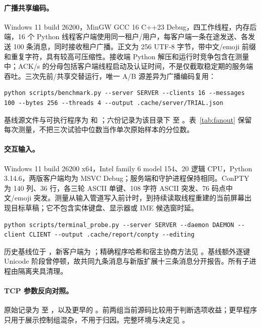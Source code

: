 \paragraph{广播共享编码。}
Windows 11 build 26200，MinGW GCC 16 C++23 Debug，四工作线程，内存后端，16 个 Python 线程客户端使用同一租户/用户，每客户端一条在途发送、各发送 100 条消息，同时接收租户广播。正文为 256 UTF-8 字节，带中文/emoji 前缀和重复字符，具有较高可压缩性。接收端 Python 解压和运行时竞争包含在测量中；ACK/s 的分母包括客户端线程启动及认证时间，不是仅截取稳定期的服务端吞吐。三次先前/共享交替运行，唯一 A/B 源差异为广播编码复用：
\begin{lstlisting}
python scripts/benchmark.py --server SERVER --clients 16 --messages 100 --bytes 256 --threads 4 --output .cache/server/TRIAL.json
\end{lstlisting}
基线源文件与可执行程序为  和 ；六份记录为该目录下  至 。表~\ref{tab:fanout} 保留每次测量，不把三次试验中位数当作单次原始样本的分位数。

\paragraph{交互输入。}
Windows 11 build 26200 x64，Intel family 6 model 154、20 逻辑 CPU，Python 3.14.6，两版客户端均为 MSVC Debug；服务端和守护进程保持相同。ConPTY 为 140 列、36 行，各三轮 ASCII 单键、108 字符 ASCII 突发、76 码点中文/emoji 突发。测量从输入管道写入前计时，到持续读取线程重建的当前屏幕出现目标草稿；它不包含实体键盘、显示器或 IME 候选窗时延。
\begin{lstlisting}
python scripts/terminal_probe.py --server SERVER --daemon DAEMON --client CLIENT --output .cache/report/conpty --editing
\end{lstlisting}
历史基线位于 ，新客户端为 ；精确程序哈希和宿主协商方法见 。基线额外逐键 Unicode 阶段曾停顿，故共同九条消息与新版扩展十三条消息分开报告。所有子进程由隔离夹具清理。

\paragraph{TCP 参数反向对照。}
原始记录为  至 ，以及更早的 。前两组当前源码比较用于判断选项收益；更早程序只用于展示控制组混杂，不用于归因。完整环境与决定见 。

